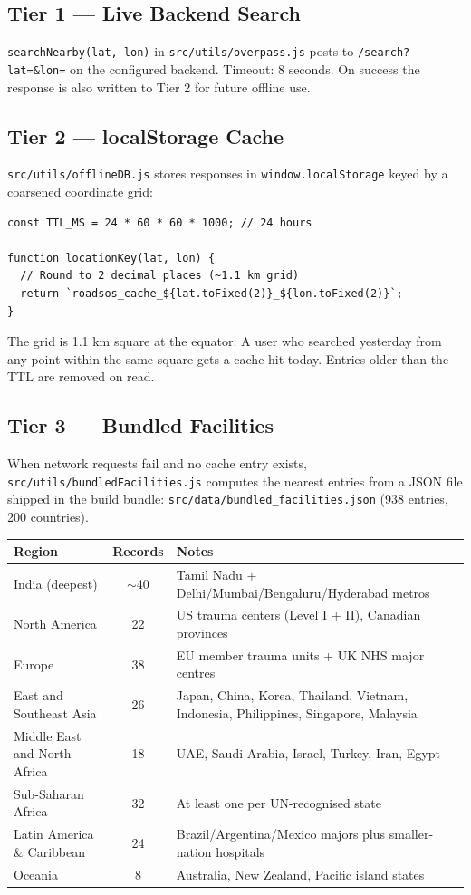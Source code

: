 \documentclass[11pt, a4paper]{article}
\newcommand{\file}[1]{\texttt{\small\color{rsblue}#1}}
\newcommand{\code}[1]{\texttt{\small#1}}
\begin{document}
\subsection{Tier 1 --- Live Backend Search}

\code{searchNearby(lat, lon)} in \file{src/utils/overpass.js} posts to \code{/search?lat=\&lon=} on the configured backend. Timeout: 8 seconds. On success the response is also written to Tier 2 for future offline use.

\subsection{Tier 2 --- localStorage Cache}

\file{src/utils/offlineDB.js} stores responses in \code{window.localStorage} keyed by a coarsened coordinate grid:

\begin{lstlisting}[caption={offlineDB.js: 24-hour client-side cache}]
const TTL_MS = 24 * 60 * 60 * 1000; // 24 hours

function locationKey(lat, lon) {
  // Round to 2 decimal places (~1.1 km grid)
  return `roadsos_cache_${lat.toFixed(2)}_${lon.toFixed(2)}`;
}
\end{lstlisting}

The grid is 1.1 km square at the equator. A user who searched yesterday from any point within the same square gets a cache hit today. Entries older than the TTL are removed on read.

\subsection{Tier 3 --- Bundled Facilities}

When network requests fail and no cache entry exists, \file{src/utils/bundledFacilities.js} computes the nearest entries from a JSON file shipped in the build bundle: \file{src/data/bundled\_facilities.json} (938 entries, 200 countries).

\begin{tabularx}{\textwidth}{l c X}
\toprule
\textbf{Region} & \textbf{Records} & \textbf{Notes} \\
\midrule
India (deepest) & $\sim$40 & Tamil Nadu + Delhi/Mumbai/Bengaluru/Hyderabad metros \\
North America & 22 & US trauma centers (Level I + II), Canadian provinces \\
Europe & 38 & EU member trauma units + UK NHS major centres \\
East and Southeast Asia & 26 & Japan, China, Korea, Thailand, Vietnam, Indonesia, Philippines, Singapore, Malaysia \\
Middle East and North Africa & 18 & UAE, Saudi Arabia, Israel, Turkey, Iran, Egypt \\
Sub-Saharan Africa & 32 & At least one per UN-recognised state \\
Latin America \& Caribbean & 24 & Brazil/Argentina/Mexico majors plus smaller-nation hospitals \\
Oceania & 8 & Australia, New Zealand, Pacific island states \\
\bottomrule
\end{tabularx}
\end{document}
